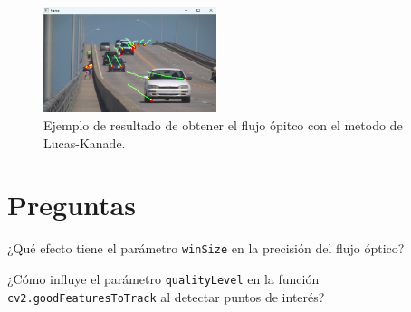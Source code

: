 \begin{figure}[H]
    \centering
    \includegraphics[width=0.45\textwidth]{Lab_4/template/figures/of_lk.png}
    \caption{Ejemplo de resultado de obtener el flujo ópitco con el metodo de Lucas-Kanade.}
    \label{fig:ejemplo_opticalflowLK}
\end{figure}

\section*{Preguntas}

\vspace{5mm}
\begin{tcolorbox}[colback=gray!10, colframe=gray!30, coltitle=black, title=Pregunta B.1, halign=left]
¿Qué efecto tiene el parámetro \texttt{winSize} en la precisión del flujo óptico?
\end{tcolorbox}


\vspace{5mm}
\begin{tcolorbox}[colback=gray!10, colframe=gray!30, coltitle=black, title=Pregunta B.2, halign=left]
¿Cómo influye el parámetro \texttt{qualityLevel} en la función \texttt{cv2.goodFeaturesToTrack} al detectar puntos de interés?
\end{tcolorbox}